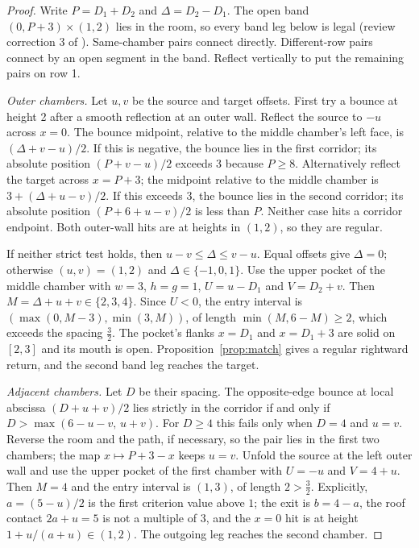 \documentclass[11pt]{article}
\theoremstyle{definition}
\theoremstyle{remark}
\begin{document}
\begin{proof}
Write $P=D_1+D_2$ and $\Delta=D_2-D_1$. The open band $(0,P+3)\times(1,2)$ lies
in the room, so every band leg below is legal (review correction 3 of
\cite{d201}). Same-chamber pairs connect directly. Different-row pairs connect by
an open segment in the band. Reflect vertically to put the remaining pairs on
row 1.

\emph{Outer chambers.} Let $u,v$ be the source and target offsets. First try a
bounce at height 2 after a smooth reflection at an outer wall. Reflect the source
to $-u$ across $x=0$. The bounce midpoint, relative to the middle chamber's left
face, is $(\Delta+v-u)/2$. If this is negative, the bounce lies in the first
corridor; its absolute position $(P+v-u)/2$ exceeds $3$ because $P\ge 8$.
Alternatively reflect the target across $x=P+3$; the midpoint relative to the
middle chamber is $3+(\Delta+u-v)/2$. If this exceeds $3$, the bounce lies in the
second corridor; its absolute position $(P+6+u-v)/2$ is less than $P$. Neither
case hits a corridor endpoint. Both outer-wall hits are at heights in $(1,2)$,
so they are regular.

If neither strict test holds, then $u-v\le\Delta\le v-u$. Equal offsets give
$\Delta=0$; otherwise $(u,v)=(1,2)$ and $\Delta\in\{-1,0,1\}$. Use the upper
pocket of the middle chamber with $w=3$, $h=g=1$, $U=u-D_1$ and $V=D_2+v$. Then
$M=\Delta+u+v\in\{2,3,4\}$. Since $U<0$, the entry interval is
$(\max(0,M-3),\min(3,M))$, of length $\min(M,6-M)\ge 2$, which exceeds the
spacing $\tfrac32$. The pocket's flanks $x=D_1$ and $x=D_1+3$ are solid on
$[2,3]$ and its mouth is open. Proposition~\ref{prop:match} gives a regular
rightward return, and the second band leg reaches the target.

\emph{Adjacent chambers.} Let $D$ be their spacing. The opposite-edge bounce at
local abscissa $(D+u+v)/2$ lies strictly in the corridor if and only if
$D>\max(6-u-v,\,u+v)$. For $D\ge 4$ this fails only when $D=4$ and $u=v$.
Reverse the room and the path, if necessary, so the pair lies in the first two
chambers; the map $x\mapsto P+3-x$ keeps $u=v$. Unfold the source at the left
outer wall and use the upper pocket of the first chamber with $U=-u$ and
$V=4+u$. Then $M=4$ and the entry interval is $(1,3)$, of length $2>\tfrac32$.
Explicitly, $a=(5-u)/2$ is the first criterion value above $1$; the exit is
$b=4-a$, the roof contact $2a+u=5$ is not a multiple of $3$, and the $x=0$ hit
is at height $1+u/(a+u)\in(1,2)$. The outgoing leg reaches the second chamber.
\end{proof}
\end{document}
